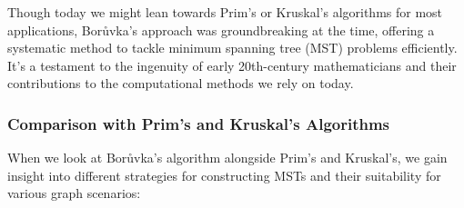 \documentclass[12pt]{book} %
\begin{document}
Though today we might lean towards Prim's or Kruskal's algorithms for most applications, Borůvka's approach was groundbreaking at the time, offering a systematic method to tackle minimum spanning tree (MST) problems efficiently. It's a testament to the ingenuity of early 20th-century mathematicians and their contributions to the computational methods we rely on today.

\subsubsection{Comparison with Prim's and Kruskal's Algorithms}

When we look at Borůvka's algorithm alongside Prim's and Kruskal's, we gain insight into different strategies for constructing MSTs and their suitability for various graph scenarios:
\end{document}
